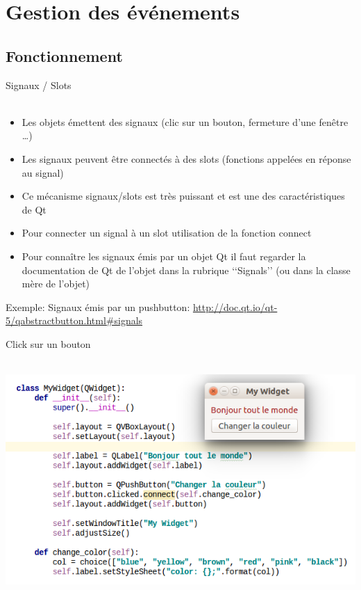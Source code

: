 \documentclass[9pt, french, brown]{beamer}
\newcommand{\mytitle}[1]{{\color{brown}#1 \\~\\}}
\begin{document}
\section{Gestion des événements} 

\subsection{Fonctionnement} 
\begin{frame}{\secname}{\subsecname}
\mytitle{Signaux / Slots}
\begin{itemize}
\item Les objets émettent des signaux (clic sur un bouton, fermeture d\rq{}une fenêtre \ldots)
\item Les signaux peuvent être connectés à des slots (fonctions appelées en réponse au signal)
\item Ce mécanisme signaux/slots est très puissant et est une des caractéristiques de Qt
\item Pour connecter un signal à un slot utilisation de la fonction connect
\item Pour connaître les signaux émis par un objet Qt il faut regarder la documentation de Qt de l\rq{}objet dans la rubrique \lq\lq{}Signals\rq\rq{} (ou dans la classe mère de l\rq{}objet)
\end{itemize}
Exemple: Signaux émis par un pushbutton: \url{http://doc.qt.io/qt-5/qabstractbutton.html\#signals}
\end{frame}

\begin{frame}[fragile]{\secname}{\subsecname}
\mytitle{Click sur un bouton}
\begin{center}\includegraphics[scale=0.4]{img/signals1_1}\end{center}
\end{frame}
\end{document}
